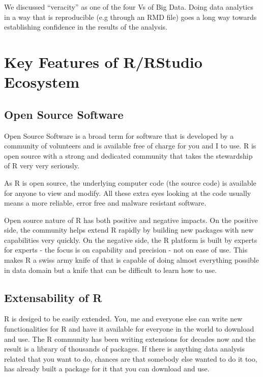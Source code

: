 \documentclass[]{krantz}
\theoremstyle{definition}
\theoremstyle{definition}
\theoremstyle{definition}
\theoremstyle{remark}
\begin{document}
We discussed ``veracity'' as one of the four Vs of Big Data. Doing data
analytics in a way that is reproducible (e.g through an RMD file) goes a
long way towards establishing confidence in the results of the analysis.

\section{Key Features of R/RStudio
Ecosystem}\label{key-features-of-rrstudio-ecosystem}

\subsection{Open Source Software}\label{open-source-software}

Open Source Software is a broad term for software that is developed by a
community of volunteers and is available free of charge for you and I to
use. R is open source with a strong and dedicated community that takes
the stewardship of R very very seriously.

As R is open source, the underlying computer code (the source code) is
available for anyone to view and modify. All these extra eyes looking at
the code usually means a more reliable, error free and malware resistant
software.

Open source nature of R has both positive and negative impacts. On the
positive side, the community helps extend R rapidly by building new
packages with new capabilities very quickly. On the negative side, the R
platform is built by experts for experts - the focus is on capability
and precision - not on ease of use. This makes R a swiss army knife of
that is capable of doing almost everything possible in data domain but a
knife that can be difficult to learn how to use.

\subsection{Extensability of R}\label{extensability-of-r}

R is desiged to be easily extended. You, me and everyone else can write
new functionalities for R and have it available for everyone in the
world to download and use. The R community has been writing extensions
for decades now and the result is a library of thousands of packages. If
there is anything data analysis related that you want to do, chances are
that somebody else wanted to do it too, has already built a package for
it that you can download and use.
\end{document}

